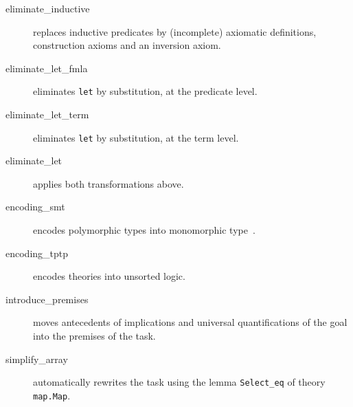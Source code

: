 \begin{description}
\item[eliminate\_inductive] replaces inductive predicates by
  (incomplete) axiomatic definitions, \ie construction axioms and
  an inversion axiom.

\item[eliminate\_let\_fmla]
  eliminates \texttt{let} by substitution, at the predicate level.

\item[eliminate\_let\_term]
  eliminates \texttt{let} by substitution, at the term level.

\item[eliminate\_let]
  applies both transformations above.



\item[encoding\_smt]
  encodes polymorphic types into monomorphic type~\cite{conchon08smt}.

\item[encoding\_tptp]
  encodes theories into unsorted logic. %





\item[introduce\_premises] moves antecedents of implications and
  universal quantifications of the goal into the premises of the task.


\item[simplify\_array] automatically rewrites the task using the lemma
  \verb|Select_eq| of theory \verb|map.Map|.


\end{description}
